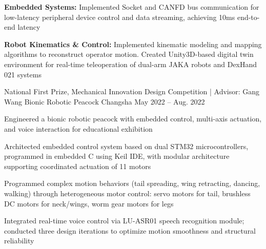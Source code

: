 \begin{cventries}
{\begin{cvitems}
        \item{\textbf{Embedded Systems:} Implemented Socket and CANFD bus communication for low-latency peripheral device control and data streaming, achieving 10ms end-to-end latency}
        \item{\textbf{Robot Kinematics \& Control:} Implemented kinematic modeling and mapping algorithms to reconstruct operator motion. Created Unity3D-based digital twin environment for real-time teleoperation of dual-arm JAKA robots and DexHand 021 systems}
      \end{cvitems}
    }
    \cventry
      {National First Prize, Mechanical Innovation Design Competition | Advisor: Gang Wang} %
      {Bionic Robotic Peacock} %
      {Changsha} %
      {May 2022 -- Aug. 2022} %
      {
        Engineered a bionic robotic peacock with embedded control, multi-axis actuation, and voice interaction for educational exhibition
        \begin{cvitems}
          \item{Architected embedded control system based on dual STM32 microcontrollers, programmed in embedded C using Keil IDE, with modular architecture supporting coordinated actuation of 11 motors}
          \item{Programmed complex motion behaviors (tail spreading, wing retracting, dancing, walking) through heterogeneous motor control: servo motors for tail, brushless DC motors for neck/wings, worm gear motors for legs}
          \item{Integrated real-time voice control via LU-ASR01 speech recognition module; conducted three design iterations to optimize motion smoothness and structural reliability}
        \end{cvitems}
      \vspace{4mm}
      }
\end{cventries}
